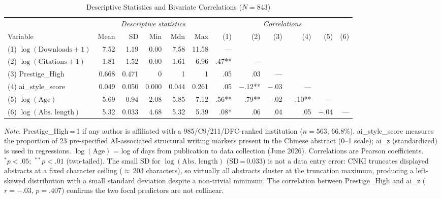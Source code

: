 \documentclass[12pt,a4paper]{article}
\begin{document}
\begin{table}[htbp]
\centering
\caption{Descriptive Statistics and Bivariate Correlations ($N = 843$)}
\label{tab:descriptives}
\begin{threeparttable}
\small
\begin{tabular}{lrrrrr|rrrrrr}
\toprule
& \multicolumn{5}{c|}{\textit{Descriptive statistics}} &
  \multicolumn{6}{c}{\textit{Correlations}} \\
\cmidrule(lr){2-6}\cmidrule(lr){7-12}
Variable & Mean & SD & Min & Mdn & Max &
  (1) & (2) & (3) & (4) & (5) & (6) \\
\midrule
(1) $\log(\text{Downloads}+1)$ & 7.52 & 1.19 & 0.00 & 7.58 & 11.58 &
  ---  &      &     &     &     &    \\
(2) $\log(\text{Citations}+1)$ & 1.81 & 1.52 & 0.00 & 1.61 & 6.96 &
  .47** & --- &     &     &     &   \\
(3) Prestige\_High & 0.668 & 0.471 & 0 & 1 & 1 &
  .05 & .03 & --- &     &     &   \\
(4) ai\_style\_score & 0.049 & 0.050 & 0.000 & 0.044 & 0.261 &
  .05 & $-$.12** & $-$.03 & --- &     &   \\
(5) $\log(\text{Age})$ & 5.69 & 0.94 & 2.08 & 5.85 & 7.12 &
  .56** & .79** & $-$.02 & $-$.10** & --- &  \\
(6) $\log(\text{Abs.\ length})$ & 5.32 & 0.033 & 4.68 & 5.32 & 5.39 &
  .08* & .06  & .04  & .05   & $-$.04 & --- \\
\bottomrule
\end{tabular}
\begin{tablenotes}
\footnotesize
\item \textit{Note.} Prestige\_High\,=\,1 if any author is affiliated with a
  985/C9/211/DFC-ranked institution ($n=563$, 66.8\%).
  ai\_style\_score measures the proportion of 23 pre-specified
  AI-associated structural writing markers present in the Chinese
  abstract (0--1 scale); ai\_z (standardized) is used in regressions.
  $\log(\text{Age})$ = log of days from publication to data collection (June 2026).
  Correlations are Pearson coefficients.
  $^{*}p<.05$;\ $^{**}p<.01$ (two-tailed).
  The small SD for $\log(\text{Abs.\ length})$ (SD\,=\,0.033) is not a
  data entry error: CNKI truncates displayed abstracts at a fixed character
  ceiling ($\approx$\,203 characters), so virtually all abstracts cluster
  at the truncation maximum, producing a left-skewed distribution with a
  small standard deviation despite a non-trivial minimum.
  The correlation between Prestige\_High and ai\_z ($r=-.03$, $p=.407$)
  confirms the two focal predictors are not collinear.
\end{tablenotes}
\end{threeparttable}
\end{table}
\end{document}
